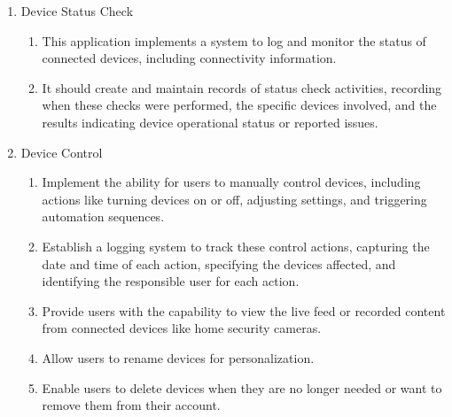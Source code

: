 \begin{enumerate}[label=\arabic*.]
\begin{enumerate}[label*={\arabic*.}]
              \item {\large{Device Status Check}}\\
                    \begin{enumerate}[label*={\arabic*.},ref=\theenumi.\arabic*]
                        \setlength{\itemindent}{0.5cm}
                        \item This application implements a system to log and monitor the status of connected devices, including connectivity information.\\
                        \item It should create and maintain records of status check activities, recording when these checks were performed, the specific devices involved, and the results indicating device operational status or reported issues.\\
                    \end{enumerate}

              \item {\large{Device Control}}\\
                    \begin{enumerate}[label*={\arabic*.},ref=\theenumi.\arabic*]
                        \setlength{\itemindent}{0.5cm}
                        \item  Implement the ability for users to manually control devices, including actions like turning devices on or off, adjusting settings, and triggering automation sequences.\\
                        \item Establish a logging system to track these control actions, capturing the date and time of each action, specifying the devices affected, and identifying the responsible user for each action.\\
                        \item Provide users with the capability to view the live feed or recorded content from connected devices like home security cameras.\\
                        \item Allow users to rename devices for personalization.\\
                        \item Enable users to delete devices when they are no longer needed or want to remove them from their account.\\
                    \end{enumerate}
          \end{enumerate}


\end{enumerate}
